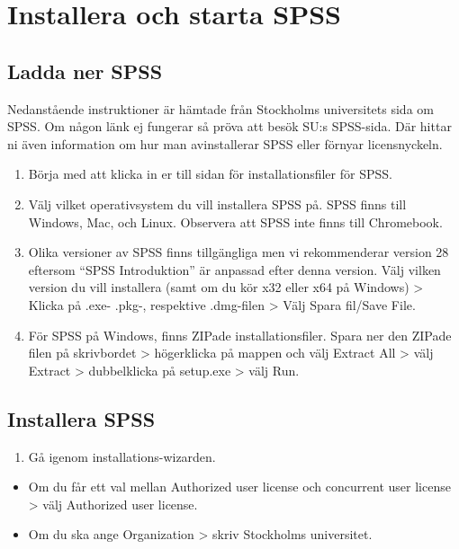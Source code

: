 \documentclass[
]{book}
\providecommand{\tightlist}{%
  \setlength{\itemsep}{0pt}\setlength{\parskip}{0pt}}
\begin{document}
\hypertarget{installera-och-starta-spss}{%
\chapter{Installera och starta SPSS}\label{installera-och-starta-spss}}

\hypertarget{ladda-ner-spss}{%
\section{Ladda ner SPSS}\label{ladda-ner-spss}}

Nedanstående instruktioner är hämtade från Stockholms universitets sida om SPSS. Om någon länk ej fungerar så pröva att besök SU:s SPSS-sida. Där hittar ni även information om hur man avinstallerar SPSS eller förnyar licensnyckeln.

\begin{enumerate}
\def\labelenumi{\arabic{enumi}.}
\item
  Börja med att klicka in er till sidan för installationsfiler för SPSS.
\item
  Välj vilket operativsystem du vill installera SPSS på. SPSS finns till Windows, Mac, och Linux. Observera att SPSS inte finns till Chromebook.
\item
  Olika versioner av SPSS finns tillgängliga men vi rekommenderar version 28 eftersom ``SPSS Introduktion'' är anpassad efter denna version. Välj vilken version du vill installera (samt om du kör x32 eller x64 på Windows) \textgreater{} Klicka på .exe- .pkg-, respektive .dmg-filen \textgreater{} Välj Spara fil/Save File.
\item
  För SPSS på Windows, finns ZIPade installationsfiler. Spara ner den ZIPade filen på skrivbordet \textgreater{} högerklicka på mappen och välj Extract All \textgreater{} välj Extract \textgreater{} dubbelklicka på setup.exe \textgreater{} välj Run.
\end{enumerate}

\hypertarget{installera-spss}{%
\section{Installera SPSS}\label{installera-spss}}

\begin{enumerate}
\def\labelenumi{\arabic{enumi}.}
\tightlist
\item
  Gå igenom installations-wizarden.
\end{enumerate}

\begin{itemize}
\item
  Om du får ett val mellan Authorized user license och concurrent user license \textgreater{} välj Authorized user license.
\item
  Om du ska ange Organization \textgreater{} skriv Stockholms universitet.
\end{itemize}
\end{document}
